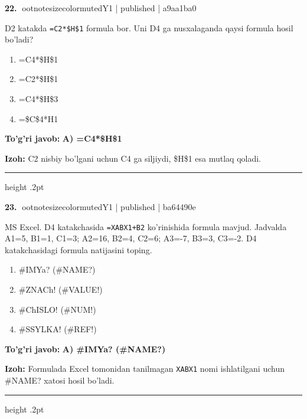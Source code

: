 \documentclass[10pt,a4paper]{article}
\begin{document}
\textbf{\color{ink}22.} {ootnotesizecolor{muted}Y1 | published | a9aa1ba0}
\par
D2 katakda \texttt{=C2*\$H\$1} formula bor. Uni D4 ga nusxalaganda qaysi formula hosil bo'ladi?
\begin{enumerate}[label=\Alph*),leftmargin=9mm]
\item =C4*\$H\$1
\item =C2*\$H\$1
\item =C4*\$H\$3
\item =\$C\$4*H1
\end{enumerate}
\begin{tcolorbox}[enhanced,breakable,colback=teal!4,colframe=teal!55!black,boxrule=0.45pt,arc=1.2mm,left=2.8mm,right=2.8mm,top=2mm,bottom=2mm]
\textbf{\color{teal}To'g'ri javob:} \textbf{A) =C4*\$H\$1}
\par\smallskip
\textbf{Izoh:} C2 nisbiy bo'lgani uchun C4 ga siljiydi, \$H\$1 esa mutlaq qoladi.
\end{tcolorbox}
\vspace{2mm}\hrule height .2pt\vspace{2mm}

\textbf{\color{ink}23.} {ootnotesizecolor{muted}Y1 | published | ba64490e}
\par
MS Excel. D4 katakchasida \texttt{=XABX1+B2} ko'rinishida formula mavjud. Jadvalda A1=5, B1=1, C1=3; A2=16, B2=4, C2=6; A3=-7, B3=3, C3=-2. D4 katakchasidagi formula natijasini toping.
\begin{enumerate}[label=\Alph*),leftmargin=9mm]
\item \#IMYa? (\#NAME?)
\item \#ZNACh! (\#VALUE!)
\item \#ChISLO! (\#NUM!)
\item \#SSYLKA! (\#REF!)
\end{enumerate}
\begin{tcolorbox}[enhanced,breakable,colback=teal!4,colframe=teal!55!black,boxrule=0.45pt,arc=1.2mm,left=2.8mm,right=2.8mm,top=2mm,bottom=2mm]
\textbf{\color{teal}To'g'ri javob:} \textbf{A) \#IMYa? (\#NAME?)}
\par\smallskip
\textbf{Izoh:} Formulada Excel tomonidan tanilmagan \texttt{XABX1} nomi ishlatilgani uchun \#NAME? xatosi hosil bo'ladi.
\end{tcolorbox}
\vspace{2mm}\hrule height .2pt\vspace{2mm}
\end{document}
